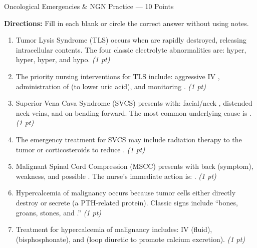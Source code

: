 \documentclass[11pt,letterpaper]{article}
\newcommand{\blank}[1][3cm]{\underline{\hspace{#1}}}
\begin{document}
\begin{diagbox}{Oncological Emergencies \& NGN Practice --- 10 Points}

\textbf{Directions:} Fill in each blank or circle the correct answer without using notes.

\begin{enumerate}[leftmargin=1.5em, label=\textbf{\arabic*.},start=11]

  \item Tumor Lysis Syndrome (TLS) occurs when \blank[5cm] are rapidly
        destroyed, releasing intracellular contents.  The four classic electrolyte
        abnormalities are: hyper\blank[2cm], hyper\blank[2cm],
        hyper\blank[2cm], and hypo\blank[2cm].
        \hfill\textit{(1 pt)}

  \item The priority nursing interventions for TLS include:
        aggressive IV \blank[3cm], administration of \blank[3cm]
        (to lower uric acid), and monitoring \blank[3cm].
        \hfill\textit{(1 pt)}

  \item Superior Vena Cava Syndrome (SVCS) presents with: facial/neck
        \blank[3cm], distended neck veins, and \blank[3cm] on bending forward.
        The most common underlying cause is \blank[4cm].
        \hfill\textit{(1 pt)}

  \item The emergency treatment for SVCS may include radiation therapy to
        \blank[4cm] the tumor or corticosteroids to reduce
        \blank[3cm].
        \hfill\textit{(1 pt)}

  \item Malignant Spinal Cord Compression (MSCC) presents with back
        \blank[3cm] (symptom), \blank[3cm] weakness, and possible
        \blank[3cm].  The nurse's immediate action is:
        \blank[5cm].
        \hfill\textit{(1 pt)}

  \item Hypercalcemia of malignancy occurs because tumor cells either directly
        destroy \blank[3cm] or secrete \blank[4cm]
        (a PTH-related protein).  Classic signs include ``bones, groans, stones, and
        \blank[2cm].''
        \hfill\textit{(1 pt)}

  \item Treatment for hypercalcemia of malignancy includes:
        IV \blank[3cm] (fluid), \blank[3cm] (bisphosphonate),
        and \blank[3cm] (loop diuretic to promote calcium excretion).
        \hfill\textit{(1 pt)}


\end{enumerate}
\end{diagbox}
\end{document}
